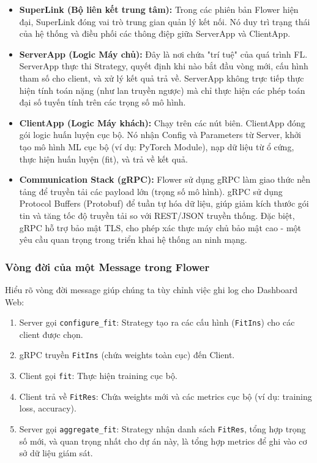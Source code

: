 \begin{itemize}
    \item \textbf{SuperLink (Bộ liên kết trung tâm):} Trong các phiên bản Flower hiện đại, SuperLink đóng vai trò trung gian quản lý kết nối. Nó duy trì trạng thái của hệ thống và điều phối các thông điệp giữa ServerApp và ClientApp.
    \item \textbf{ServerApp (Logic Máy chủ):} Đây là nơi chứa "trí tuệ" của quá trình FL. ServerApp thực thi Strategy, quyết định khi nào bắt đầu vòng mới, cấu hình tham số cho client, và xử lý kết quả trả về. ServerApp không trực tiếp thực hiện tính toán nặng (như lan truyền ngược) mà chỉ thực hiện các phép toán đại số tuyến tính trên các trọng số mô hình.
    \item \textbf{ClientApp (Logic Máy khách):} Chạy trên các nút biên. ClientApp đóng gói logic huấn luyện cục bộ. Nó nhận Config và Parameters từ Server, khởi tạo mô hình ML cục bộ (ví dụ: PyTorch Module), nạp dữ liệu từ ổ cứng, thực hiện huấn luyện (fit), và trả về kết quả.
    \item \textbf{Communication Stack (gRPC):} Flower sử dụng gRPC làm giao thức nền tảng để truyền tải các payload lớn (trọng số mô hình). gRPC sử dụng Protocol Buffers (Protobuf) để tuần tự hóa dữ liệu, giúp giảm kích thước gói tin và tăng tốc độ truyền tải so với REST/JSON truyền thống. Đặc biệt, gRPC hỗ trợ bảo mật TLS, cho phép xác thực máy chủ bảo mật cao - một yêu cầu quan trọng trong triển khai hệ thống an ninh mạng.
\end{itemize}

\subsubsection{Vòng đời của một Message trong Flower}
Hiểu rõ vòng đời message giúp chúng ta tùy chỉnh việc ghi log cho Dashboard Web:
\begin{enumerate}
    \item Server gọi \texttt{configure\_fit}: Strategy tạo ra các cấu hình (\texttt{FitIns}) cho các client được chọn.
    \item gRPC truyền \texttt{FitIns} (chứa weights toàn cục) đến Client.
    \item Client gọi \texttt{fit}: Thực hiện training cục bộ.
    \item Client trả về \texttt{FitRes}: Chứa weights mới và các metrics cục bộ (ví dụ: training loss, accuracy).
    \item Server gọi \texttt{aggregate\_fit}: Strategy nhận danh sách \texttt{FitRes}, tổng hợp trọng số mới, và quan trọng nhất cho dự án này, là tổng hợp metrics để ghi vào cơ sở dữ liệu giám sát.
\end{enumerate}


